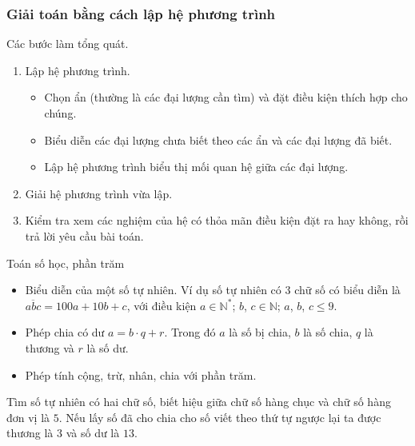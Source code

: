 \subsubsection{Giải toán bằng cách lập hệ phương trình}
Các bước làm tổng quát.
\begin{enumerate}[Bước 1.]
	\item Lập hệ phương trình.
	\begin{itemize}
		\item Chọn ẩn (thường là các đại lượng cần tìm) và đặt điều kiện thích hợp cho chúng.
		\item Biểu diễn các đại lượng chưa biết theo các ẩn và các đại lượng đã biết.
		\item Lập hệ phương trình biểu thị mối quan hệ giữa các đại lượng.
	\end{itemize}
	\item Giải hệ phương trình vừa lập.
	\item Kiểm tra xem các nghiệm của hệ có thỏa mãn điều kiện đặt ra hay không, rồi trả lời yêu cầu bài toán.
\end{enumerate}
\begin{dang}{Toán số học, phần trăm}
	\begin{itemize}
		\item Biểu diễn của một số tự nhiên. Ví dụ số tự nhiên có $3$ chữ số có biểu diễn là $\overline{abc}=100a+10b+c$, với điều kiện $a\in \mathbb{N}^*$; $b$, $c\in \mathbb{N}$; $a$, $b$, $c\le 9$.
		\item Phép chia có dư $a=b\cdot q+r$. Trong đó $a$ là số bị chia, $b$ là số chia, $q$ là thương và $r$ là số dư.
		\item Phép tính cộng, trừ, nhân, chia với phần trăm.
	\end{itemize}
\end{dang}
\begin{bt}
	Tìm số tự nhiên có hai chữ số, biết hiệu giữa chữ số hàng chục và chữ số hàng đơn vị là $5$. Nếu lấy số đã cho chia cho số viết theo thứ tự ngược lại ta được thương là $3$ và số dư là $13$.
\end{bt}
